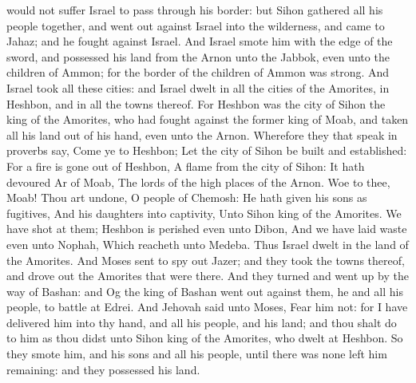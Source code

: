would not suffer Israel to pass through his border: but Sihon gathered all his people together, and went out against Israel into the wilderness, and came to Jahaz; and he fought against Israel. And Israel smote him with the edge of the sword, and possessed his land from the Arnon unto the Jabbok, even unto the children of Ammon; for the border of the children of Ammon was strong. And Israel took all these cities: and Israel dwelt in all the cities of the Amorites, in Heshbon, and in all the towns thereof. For Heshbon was the city of Sihon the king of the Amorites, who had fought against the former king of Moab, and taken all his land out of his hand, even unto the Arnon. Wherefore they that speak in proverbs say, Come ye to Heshbon; Let the city of Sihon be built and established:  For a fire is gone out of Heshbon, A flame from the city of Sihon: It hath devoured Ar of Moab, The lords of the high places of the Arnon.  Woe to thee, Moab! Thou art undone, O people of Chemosh: He hath given his sons as fugitives, And his daughters into captivity, Unto Sihon king of the Amorites.  We have shot at them; Heshbon is perished even unto Dibon, And we have laid waste even unto Nophah, Which reacheth unto Medeba.  Thus Israel dwelt in the land of the Amorites. And Moses sent to spy out Jazer; and they took the towns thereof, and drove out the Amorites that were there.  And they turned and went up by the way of Bashan: and Og the king of Bashan went out against them, he and all his people, to battle at Edrei. And Jehovah said unto Moses, Fear him not: for I have delivered him into thy hand, and all his people, and his land; and thou shalt do to him as thou didst unto Sihon king of the Amorites, who dwelt at Heshbon. So they smote him, and his sons and all his people, until there was none left him remaining: and they possessed his land. 

